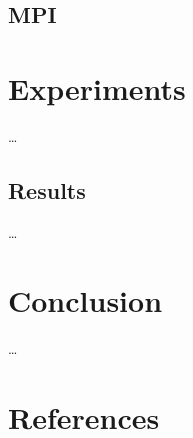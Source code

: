\documentclass{article}
\begin{document}
\subsection{MPI}\label{sec:mpi}

\section{Experiments}\label{sec:experiments}
\ldots

\subsection{Results}\label{sec:results}
\ldots

\section{Conclusion}\label{sec:conclusion}
\ldots

\section{References}\label{sec:references}
\printbibliography[heading=none]
\end{document}
